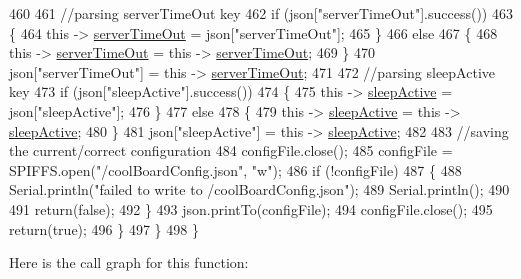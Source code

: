 \begin{DoxyCode}
460 
461             \textcolor{comment}{//parsing serverTimeOut key}
462             \textcolor{keywordflow}{if} (json[\textcolor{stringliteral}{"serverTimeOut"}].success())
463             \{
464                 \textcolor{keyword}{this} -> \hyperlink{classCoolBoard_a7a8d8d3d316220cdd049cd63c1aa8fe6}{serverTimeOut} = json[\textcolor{stringliteral}{"serverTimeOut"}];
465             \}
466             \textcolor{keywordflow}{else}
467             \{
468                 \textcolor{keyword}{this} -> \hyperlink{classCoolBoard_a7a8d8d3d316220cdd049cd63c1aa8fe6}{serverTimeOut} = \textcolor{keyword}{this} -> \hyperlink{classCoolBoard_a7a8d8d3d316220cdd049cd63c1aa8fe6}{serverTimeOut};
469             \}
470             json[\textcolor{stringliteral}{"serverTimeOut"}] = \textcolor{keyword}{this} -> \hyperlink{classCoolBoard_a7a8d8d3d316220cdd049cd63c1aa8fe6}{serverTimeOut};
471             
472             \textcolor{comment}{//parsing sleepActive key}
473             \textcolor{keywordflow}{if} (json[\textcolor{stringliteral}{"sleepActive"}].success())
474             \{
475                 \textcolor{keyword}{this} -> \hyperlink{classCoolBoard_a0a51b2287139f66c738101fb53139230}{sleepActive} = json[\textcolor{stringliteral}{"sleepActive"}];
476             \}
477             \textcolor{keywordflow}{else}
478             \{
479                 \textcolor{keyword}{this} -> \hyperlink{classCoolBoard_a0a51b2287139f66c738101fb53139230}{sleepActive} = \textcolor{keyword}{this} -> \hyperlink{classCoolBoard_a0a51b2287139f66c738101fb53139230}{sleepActive};
480             \}
481             json[\textcolor{stringliteral}{"sleepActive"}] = \textcolor{keyword}{this} -> \hyperlink{classCoolBoard_a0a51b2287139f66c738101fb53139230}{sleepActive};
482 
483             \textcolor{comment}{//saving the current/correct configuration}
484             configFile.close();
485             configFile = SPIFFS.open(\textcolor{stringliteral}{"/coolBoardConfig.json"}, \textcolor{stringliteral}{"w"});
486             \textcolor{keywordflow}{if} (!configFile)
487             \{
488                 Serial.println(\textcolor{stringliteral}{"failed to write to /coolBoardConfig.json"});
489                 Serial.println();
490  
491                 \textcolor{keywordflow}{return}(\textcolor{keyword}{false});
492             \}
493             json.printTo(configFile);
494             configFile.close();
495             \textcolor{keywordflow}{return}(\textcolor{keyword}{true});
496         \}
497     \}
498 \}
\end{DoxyCode}
Here is the call graph for this function\+:
